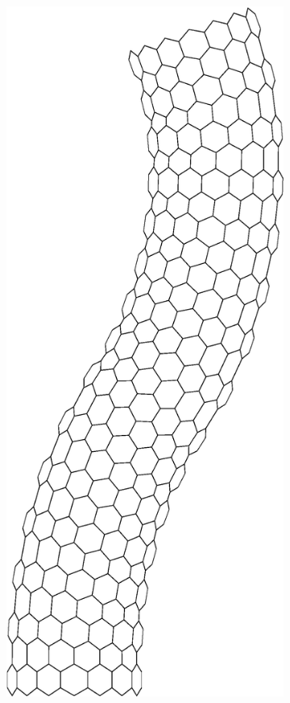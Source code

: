 \begin{figure}[t!]
\begin{subfigure}[t]{.33\textwidth}
			\includegraphics[scale=.25]{./fig/ch1/Nanotube.eps}
			\caption{\label{subfig:Nanotube}}
		\end{subfigure}%
		~
		\begin{subfigure}[t]{.33\textwidth}

\end{subfigure}
\end{figure}
